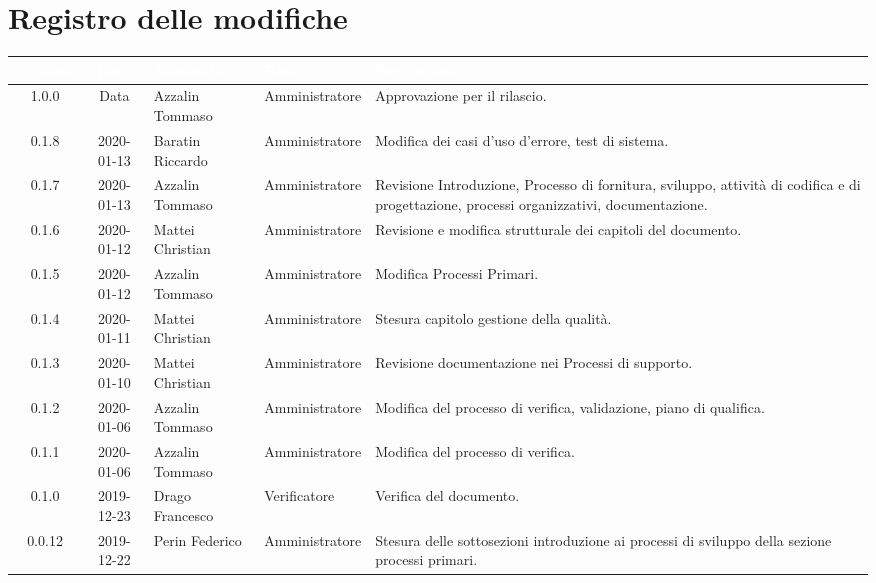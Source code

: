 \section*{Registro delle modifiche}
{
\renewcommand{\arraystretch}{1.5}
\centering
\begin{longtable}{c c  C{4cm}  C{3cm} C{4cm}}
\textcolor{white}{\textbf{Versione}} & \textcolor{white}{\textbf{Data}} & \textcolor{white}{\textbf{Nominativo}} & \textcolor{white}{\textbf{Ruolo}} & \textcolor{white}{\textbf{Descrizione}}\\	
\endhead


1.0.0 & Data & Azzalin Tommaso & Amministratore & Approvazione per il rilascio.  \\

0.1.8 & 2020-01-13 & Baratin Riccardo & Amministratore & Modifica dei casi d'uso d'errore, test di sistema. \\

0.1.7 & 2020-01-13 & Azzalin Tommaso & Amministratore & Revisione Introduzione, Processo di fornitura, sviluppo, attività di codifica e di progettazione, processi organizzativi, documentazione. \\

0.1.6 & 2020-01-12 & Mattei Christian & Amministratore & Revisione e modifica strutturale dei capitoli del documento. \\

0.1.5 & 2020-01-12 & Azzalin Tommaso & Amministratore & Modifica Processi Primari. \\

0.1.4 & 2020-01-11 & Mattei Christian & Amministratore & Stesura capitolo gestione della qualità. \\

0.1.3 & 2020-01-10 & Mattei Christian & Amministratore & Revisione documentazione nei Processi di supporto. \\

0.1.2 & 2020-01-06 & Azzalin Tommaso & Amministratore & Modifica del processo di verifica, validazione, piano di qualifica. \\

0.1.1 & 2020-01-06 & Azzalin Tommaso & Amministratore & Modifica del processo di verifica. \\

0.1.0 & 2019-12-23 & Drago Francesco & Verificatore & Verifica del documento. \\

0.0.12 & 2019-12-22 & Perin Federico & Amministratore & Stesura delle sottosezioni introduzione ai processi di sviluppo della sezione processi primari. \\


\end{longtable}}
